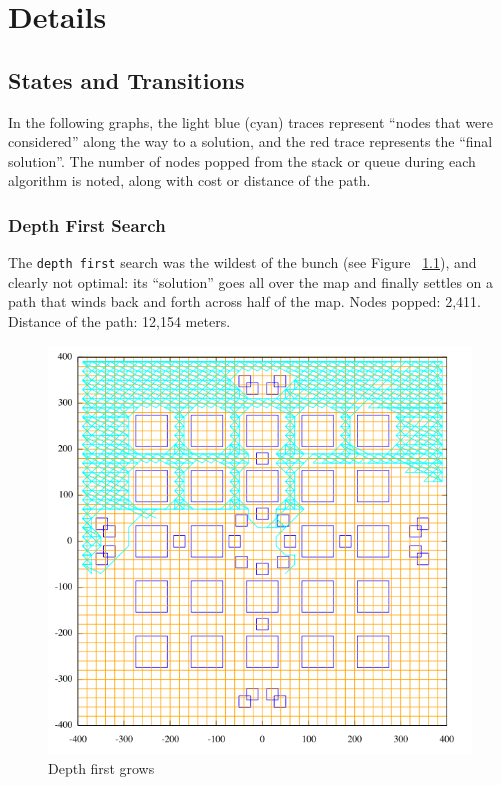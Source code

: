 \chapter{Details}\label{chap:details}
\section{States and Transitions}\label{sec:search}
In the following graphs, the light blue (cyan) traces represent ``nodes that were considered'' along the way to a solution, and the red trace represents the ``final solution''.  The number of nodes popped from the stack or queue during each algorithm is noted, along with cost or distance of the path.

\subsection{Depth First Search}
The \texttt{depth first} search was the wildest of the bunch (see Figure ~\ref{fig:df}), and clearly not optimal: its ``solution'' goes all over the map and finally settles on a path that winds back and forth across half of the map.  Nodes popped: 2,411.  Distance of the path: 12,154 meters.

\begin{figure}\label{fig:df}
\begin{center}\centering
\includegraphics[width=\textwidth]{df1.png}
\caption{Depth first grows}
\end{center}
\end{figure}

